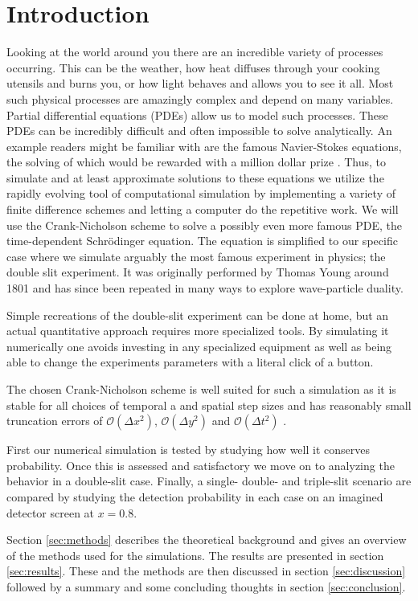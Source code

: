 \documentclass[english,notitlepage,reprint,nofootinbib]{revtex4-1}  %
\begin{document}
\section{Introduction}
%
Looking at the world around you there are an incredible variety of processes occurring. This can be the weather, how heat diffuses through your cooking utensils and burns you, or how light behaves and allows you to see it all. Most such physical processes are amazingly complex and depend on many variables. Partial differential equations (PDEs) allow us to model such processes.
These PDEs can be incredibly difficult and often impossible to solve analytically. An example readers might be familiar with are the famous Navier-Stokes equations, the solving of which would be rewarded with a million dollar prize \cite{millennium}. Thus, to simulate and at least approximate solutions to these equations we utilize the rapidly evolving tool of computational simulation by implementing a variety of finite difference schemes and letting a computer do the repetitive work.
We will use the Crank-Nicholson scheme to solve a possibly even more famous PDE, the time-dependent Schrödinger equation. The equation is simplified to our specific case where we simulate arguably the most famous experiment in physics; the double slit experiment. It was originally performed by Thomas Young around 1801 \cite{experiment} and has since been repeated in many ways to explore wave-particle duality.

Simple recreations of the double-slit experiment can be done at home, but an actual quantitative approach requires more specialized tools. By simulating it numerically one avoids investing in any specialized equipment as well as being able to change the experiments parameters with a literal click of a button.

The chosen Crank-Nicholson scheme is well suited for such a simulation as it is stable for all choices of temporal a and spatial step sizes and has reasonably small truncation errors of $\mathcal{O}(\Delta x^2)$, $\mathcal{O}(\Delta y^2)$ and $\mathcal{O}(\Delta t^2)$ \cite{compendium}.

First our numerical simulation is tested by studying how well it conserves probability. Once this is assessed and satisfactory we move on to analyzing the behavior in a double-slit case. Finally, a single- double- and triple-slit scenario are compared by studying the detection probability in each case on an imagined detector screen at $x=0.8$.

Section \ref{sec:methods} describes the theoretical background and gives an overview of the methods used for the simulations. The results are presented in section \ref{sec:results}. These and the methods are then discussed in section \ref{sec:discussion} followed by a summary and some concluding thoughts in section \ref{sec:conclusion}.
\end{document}
